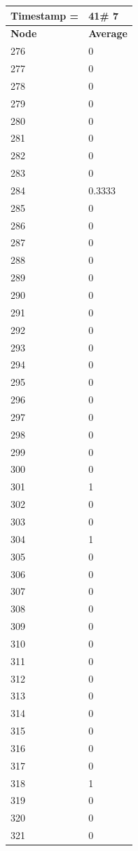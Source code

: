 \begin{tabular}{|l||l|}
\hline
\textbf{Timestamp =} & \textbf{41}\# 7\\\hline
	\textbf{Node} & \textbf{Average} \\ \hline
\hline
	276 & 0 \\ \hline
	277 & 0 \\ \hline
	278 & 0 \\ \hline
	279 & 0 \\ \hline
	280 & 0 \\ \hline
	281 & 0 \\ \hline
	282 & 0 \\ \hline
	283 & 0 \\ \hline
	284 & 0.3333 \\ \hline
	285 & 0 \\ \hline
	286 & 0 \\ \hline
	287 & 0 \\ \hline
	288 & 0 \\ \hline
	289 & 0 \\ \hline
	290 & 0 \\ \hline
	291 & 0 \\ \hline
	292 & 0 \\ \hline
	293 & 0 \\ \hline
	294 & 0 \\ \hline
	295 & 0 \\ \hline
	296 & 0 \\ \hline
	297 & 0 \\ \hline
	298 & 0 \\ \hline
	299 & 0 \\ \hline
	300 & 0 \\ \hline
	301 & 1 \\ \hline
	302 & 0 \\ \hline
	303 & 0 \\ \hline
	304 & 1 \\ \hline
	305 & 0 \\ \hline
	306 & 0 \\ \hline
	307 & 0 \\ \hline
	308 & 0 \\ \hline
	309 & 0 \\ \hline
	310 & 0 \\ \hline
	311 & 0 \\ \hline
	312 & 0 \\ \hline
	313 & 0 \\ \hline
	314 & 0 \\ \hline
	315 & 0 \\ \hline
	316 & 0 \\ \hline
	317 & 0 \\ \hline
	318 & 1 \\ \hline
	319 & 0 \\ \hline
	320 & 0 \\ \hline
	321 & 0 \\ \hline
\end{tabular}
